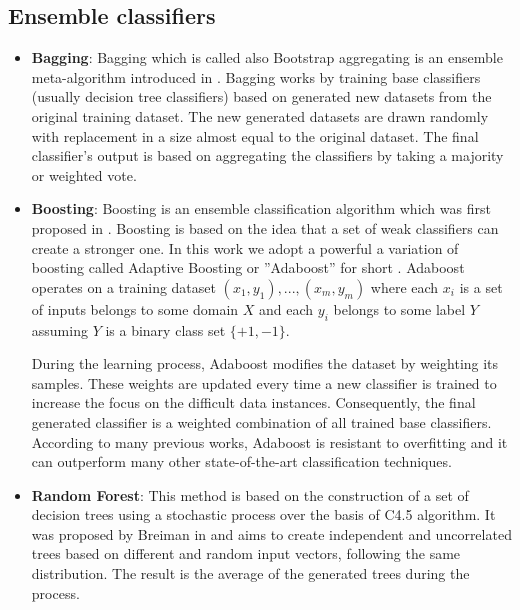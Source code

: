 \documentclass[a4paper,10pt,twocolumn,preprint,3p]{elsarticle}
\begin{document}
\subsection{Ensemble classifiers}
\label{subsec:ensembles}

\begin{itemize}
\item \textbf{Bagging}: 
Bagging which is called also Bootstrap aggregating is an ensemble meta-algorithm introduced in \cite{B1996}. Bagging works by training base classifiers (usually decision tree classifiers) based on generated new datasets from the original training dataset. The new generated datasets are drawn randomly with replacement in a size almost equal to the original dataset. The final classifier's output is based on aggregating the classifiers by taking a majority or weighted vote.


\item \textbf{Boosting}: 
Boosting is an ensemble classification algorithm which was first proposed in \cite{schapire1990strength}. Boosting is based on the idea that a set of weak classifiers can create a stronger one. In this work we adopt a powerful a variation of boosting called Adaptive Boosting or ''Adaboost'' for short \cite{FS1997}. Adaboost operates on a training dataset ${(x_{1},y_{1}),...,(x_{m},y_{m})}$ where each $x_{i}$ is a set of inputs belongs to some domain $X$ and each $y_{i}$ belongs to some label $Y$ assuming $Y$ is a binary class set $\{+1,-1\}$. 


During the learning process, Adaboost modifies the dataset by weighting its samples. These weights are updated every time a new classifier is trained to increase the focus on the difficult data instances. Consequently, the final generated classifier is a weighted combination of all trained base classifiers. According to many previous works, Adaboost is resistant to overfitting and it can outperform many other state-of-the-art classification techniques.


\item \textbf{Random Forest}:
This method is based on the construction of a set of decision trees using a stochastic process over the basis of C4.5 algorithm. It was proposed by Breiman in \cite{Breiman2001} and aims to create independent and uncorrelated trees based on different and random input vectors, following the same distribution. 
The result is the average of the generated trees during the process.
\end{itemize}
\end{document}
